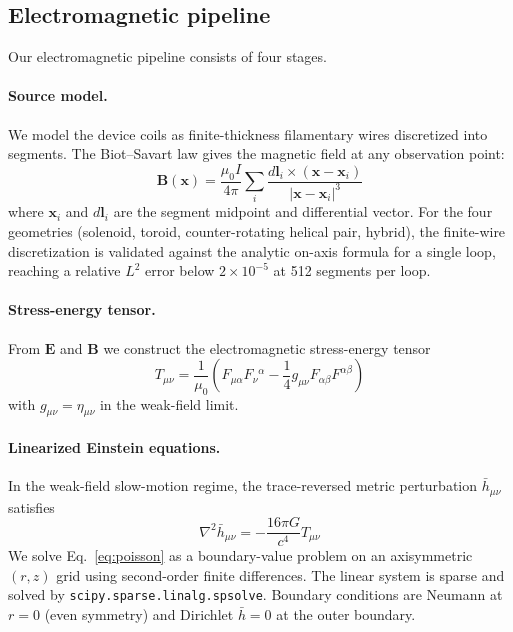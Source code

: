 \documentclass[11pt,a4paper,twocolumn]{article}
\begin{document}
\subsection{Electromagnetic pipeline}
\label{subsec:em}

Our electromagnetic pipeline consists of four stages.

\paragraph{Source model.} We model the device coils as finite-thickness
filamentary wires discretized into segments. The Biot--Savart law gives
the magnetic field at any observation point:
\begin{equation}
\mathbf{B}(\mathbf{x}) = \frac{\mu_0 I}{4\pi} \sum_i
\frac{d\mathbf{l}_i \times (\mathbf{x} - \mathbf{x}_i)}
{|\mathbf{x} - \mathbf{x}_i|^3}
\end{equation}
where $\mathbf{x}_i$ and $d\mathbf{l}_i$ are the segment midpoint and
differential vector. For the four geometries (solenoid, toroid,
counter-rotating helical pair, hybrid), the finite-wire discretization
is validated against the analytic on-axis formula for a single loop,
reaching a relative $L^2$ error below $2\times 10^{-5}$ at 512
segments per loop.

\paragraph{Stress-energy tensor.} From $\mathbf{E}$ and $\mathbf{B}$ we
construct the electromagnetic stress-energy tensor
\begin{equation}
T_{\mu\nu} = \frac{1}{\mu_0}\left(F_{\mu\alpha}F_\nu{}^\alpha
- \frac{1}{4} g_{\mu\nu} F_{\alpha\beta}F^{\alpha\beta}\right)
\end{equation}
with $g_{\mu\nu} = \eta_{\mu\nu}$ in the weak-field limit.

\paragraph{Linearized Einstein equations.} In the weak-field
slow-motion regime, the trace-reversed metric perturbation
$\bar{h}_{\mu\nu}$ satisfies
\begin{equation}
\nabla^2 \bar{h}_{\mu\nu} = -\frac{16\pi G}{c^4} T_{\mu\nu}
\label{eq:poisson}
\end{equation}
We solve Eq.~\eqref{eq:poisson} as a boundary-value problem on an
axisymmetric $(r,z)$ grid using second-order finite differences.
The linear system is sparse and solved by
\texttt{scipy.sparse.linalg.spsolve}. Boundary conditions are Neumann
at $r=0$ (even symmetry) and Dirichlet $\bar{h}=0$ at the outer boundary.
\end{document}
